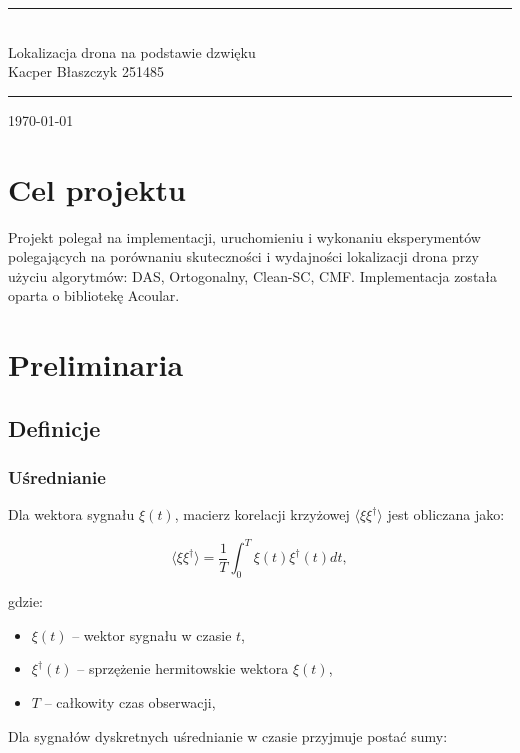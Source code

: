 \documentclass[12pt]{article}
\begin{document}

\begin{titlepage}
\centering
\vspace*{\fill}
\rule{\textwidth}{1pt}\\[1em]
{\fontsize{36pt}{38pt}\selectfont Lokalizacja drona na podstawie dzwięku}\\[1em]
{Kacper Błaszczyk 251485}
\rule{\textwidth}{1pt}
{\today}
\vspace*{\fill}

\end{titlepage}

\setcounter{tocdepth}{3}
\tableofcontents

\newpage
{}

\section{Cel projektu}
Projekt polegał na implementacji, uruchomieniu i wykonaniu eksperymentów polegających na porównaniu skuteczności i wydajności lokalizacji drona przy użyciu algorytmów: DAS, Ortogonalny, Clean-SC, CMF. Implementacja została oparta o bibliotekę Acoular.

\section{Preliminaria}

\subsection{Definicje}
\subsubsection{Uśrednianie}
Dla wektora sygnału \( \xi(t) \), macierz korelacji krzyżowej \( \langle \xi\xi^{\dagger} \rangle \) jest obliczana jako:

\begin{equation}
\langle \xi\xi^{\dagger} \rangle = \frac{1}{T} \int_{0}^{T} \xi(t) \xi^{\dagger}(t) dt,
\end{equation}

gdzie:

\begin{itemize}
    \item \( \xi(t) \) – wektor sygnału w czasie \( t \),
    \item \( \xi^{\dagger}(t) \) – sprzężenie hermitowskie wektora \( \xi(t) \),
    \item \( T \) – całkowity czas obserwacji,
\end{itemize}
Dla sygnałów dyskretnych uśrednianie w czasie przyjmuje postać sumy:
\end{document}
